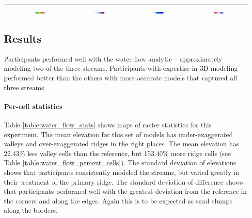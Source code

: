 \documentclass[prodmode,acmtochi]{acmsmall} %
\begin{document}
\begin{table}
{\begin{tabular}{m{} m{} m{} m{} m{}}
%
& 
\multicolumn{1}{c}{\includegraphics[width=0.22\textwidth]{images/legends/elevation_legend_5.pdf}} &
\multicolumn{1}{c}{\includegraphics[width=0.22\textwidth]{images/legends/stdev_diff_legend.pdf}} &
\multicolumn{1}{c}{\includegraphics[width=0.22\textwidth]{images/legends/depth_legend.pdf}} &
\multicolumn{1}{c}{\includegraphics[width=0.22\textwidth]{images/legends/depth_diff_legend.pdf}}\\
%
\bottomrule
\end{tabular}}
\label{table:water_flow_comparison} 
\end{table}


\subsection{Results}
Participants performed well with the water flow analytic 
-- approximately modeling two of the three streams.  
Participants with expertise in 3D modeling performed 
better than the others with more accurate models
that captured all three streams.

\paragraph{Per-cell statistics}
Table \ref{table:water_flow_stats} shows maps of raster statistics for this experiment.
The mean elevation for this set of models
has under-exaggerated valleys and 
over-exaggerated ridges in the right places. 
The mean elevation has 22.43\% less valley cells than the reference, 
but 153.40\% more ridge cells
(see Table \ref{table:water_flow_percent_cells}). 
The standard deviation of elevations shows that participants 
consistently modeled the streams, but
varied greatly in their treatment of the primary ridge. 
The standard deviation of difference shows that participants 
performed well 
with the greatest deviation from the reference
in the corners and along the edges. 
Again this is to be expected 
as sand slumps along the borders. 
\end{document}
